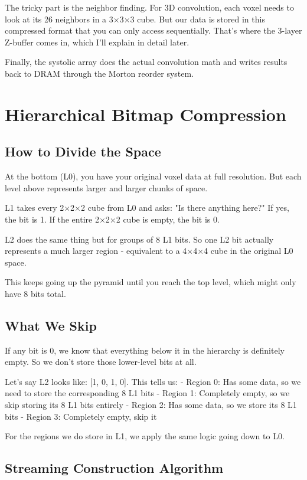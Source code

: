 \documentclass[12pt]{article}
\begin{document}
The tricky part is the neighbor finding. For 3D convolution, each voxel needs to look at its 26 neighbors in a 3×3×3 cube. But our data is stored in this compressed format that you can only access sequentially. That's where the 3-layer Z-buffer comes in, which I'll explain in detail later.

Finally, the systolic array does the actual convolution math and writes results back to DRAM through the Morton reorder system.

\section{Hierarchical Bitmap Compression}

\subsection{How to Divide the Space}

At the bottom (L0), you have your original voxel data at full resolution. But each level above represents larger and larger chunks of space.

L1 takes every 2×2×2 cube from L0 and asks: "Is there anything here?" If yes, the bit is 1. If the entire 2×2×2 cube is empty, the bit is 0.

L2 does the same thing but for groups of 8 L1 bits. So one L2 bit actually represents a much larger region - equivalent to a 4×4×4 cube in the original L0 space.

This keeps going up the pyramid until you reach the top level, which might only have 8 bits total.

\subsection{What We Skip}

If any bit is 0, we know that everything below it in the hierarchy is definitely empty. So we don't store those lower-level bits at all.

Let's say L2 looks like: [1, 0, 1, 0]. This tells us:
- Region 0: Has some data, so we need to store the corresponding 8 L1 bits
- Region 1: Completely empty, so we skip storing its 8 L1 bits entirely
- Region 2: Has some data, so we store its 8 L1 bits  
- Region 3: Completely empty, skip it

For the regions we do store in L1, we apply the same logic going down to L0.

\subsection{Streaming Construction Algorithm}
\end{document}
